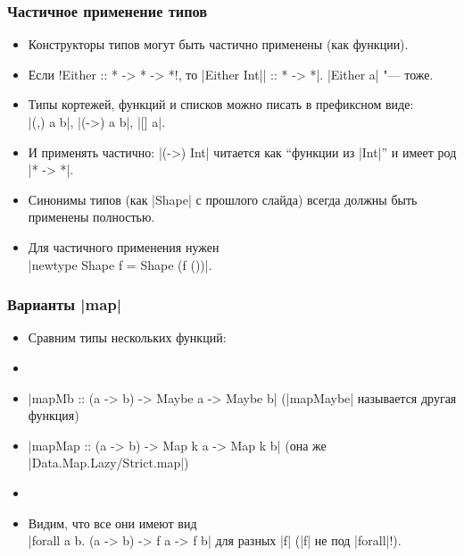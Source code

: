 \documentclass[11pt]{beamer}
\begin{document}
\begin{frame}[fragile]
  \frametitle{Частичное применение типов}
  \begin{itemize}
    \item Конструкторы типов могут быть частично применены (как функции).
    \item Если \haskinline!Either :: * -> * -> *!, то \haskinline|Either Int|\pause\haskinline| :: * -> *|. \haskinline|Either a| "--- тоже.
          \pause
    \item Типы кортежей, функций и списков можно писать в префиксном виде: \\
          \haskinline|(,) a b|, \haskinline|(->) a b|, \haskinline|[] a|.
          \pause
    \item И применять частично: \haskinline|(->) Int| читается как \enquote{функции из \haskinline|Int|} и имеет род \pause\haskinline|* -> *|.
          \pause
    \item Синонимы типов (как \haskinline|Shape| с прошлого слайда) всегда должны быть применены полностью.
          \pause
    \item Для частичного применения нужен \\
          \haskinline|newtype Shape f = Shape (f ())|.
  \end{itemize}
\end{frame}

\begin{frame}[fragile]
  \frametitle{Варианты \haskinline|map|}
  \begin{itemize}
    \item Сравним типы нескольких функций:
    \item {}
          \pause
    \item \haskinline|mapMb :: (a -> b) -> Maybe a -> Maybe b| (\haskinline|mapMaybe| называется другая функция)
          \pause
    \item \haskinline|mapMap :: (a -> b) -> Map k a -> Map k b| (она же \haskinline|Data.Map.{Lazy/Strict}.map|)
          \pause
    \item {} \pause
    \item Видим, что все они имеют вид \pause \\
          \haskinline|forall a b. (a -> b) -> f a -> f b| для разных \haskinline|f| (\haskinline|f| не под \haskinline|forall|!).
  \end{itemize}
\end{frame}
\end{document}
